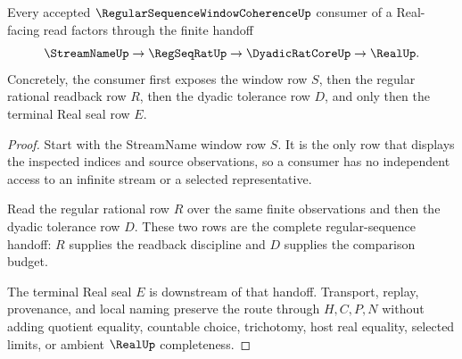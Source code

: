 \begin{theorem}
\label{thm:regular-sequence-window-coherence-stream-regseqrat-handoff}
Every accepted $\RegularSequenceWindowCoherenceUp$ consumer of a Real-facing read factors through the finite handoff
$$
\StreamNameUp \to \RegSeqRatUp \to \DyadicRatCoreUp \to \RealUp .
$$
Concretely, the consumer first exposes the window row $S$, then the regular rational readback row $R$, then the dyadic tolerance row $D$, and only then the terminal Real seal row $E$.
\end{theorem}
\begin{proof}
Start with the StreamName window row $S$. It is the only row that displays the inspected indices and source observations, so a consumer has no independent access to an infinite stream or a selected representative.

Read the regular rational row $R$ over the same finite observations and then the dyadic tolerance row $D$. These two rows are the complete regular-sequence handoff: $R$ supplies the readback discipline and $D$ supplies the comparison budget.

The terminal Real seal $E$ is downstream of that handoff. Transport, replay, provenance, and local naming preserve the route through $H,C,P,N$ without adding quotient equality, countable choice, trichotomy, host real equality, selected limits, or ambient $\RealUp$ completeness.
\end{proof}




